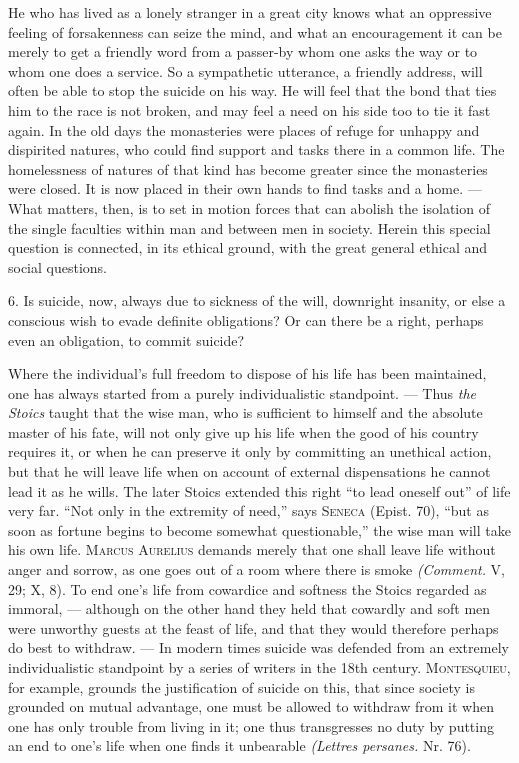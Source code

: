 \documentclass[12pt,a4paper,openany]{book}
\newcommand{\opage}[1]{\marginnote{\footnotesize\textit{[#1]}}}
\begin{document}
He who has lived as a lonely stranger in a great city knows what an oppressive feeling of forsakenness can seize
the mind, and what an encouragement it can be merely to get a friendly word from a passer-by whom one asks the way
or to whom one does a service. So a sympathetic utterance, a friendly address, will often be able to stop the
suicide on his way. He will feel that the bond that ties him to the race is not broken, and may feel a need on his
side too to tie it fast again. In the old days the monasteries were places of refuge for unhappy and dispirited
natures, who could find support and tasks there in a common life. The homelessness of natures of that kind has
become greater since the monasteries were closed. It is now placed in their own hands to find tasks and a home.
--- What
\opage{214}matters, then, is to set in motion forces that can abolish the isolation of the single faculties within
man and between men in society. Herein this special question is connected, in its ethical ground, with the great
general ethical and social questions.

6. Is suicide, now, always due to sickness of the will, downright insanity, or else a conscious wish to evade
definite obligations? Or can there be a right, perhaps even an obligation, to commit suicide?

Where the individual's full freedom to dispose of his life has been maintained, one has always started from a
purely individualistic standpoint. --- Thus \textit{the Stoics} taught that the wise man, who is sufficient to
himself and the absolute master of his fate, will not only give up his life when the good of his country requires
it, or when he can preserve it only by committing an unethical action, but that he will leave life when on account
of external dispensations he cannot lead it as he wills. The later Stoics extended this right ``to lead oneself
out'' of life very far. ``Not only in the extremity of need,'' says \textsc{Seneca} (Epist. 70), ``but as soon as
fortune begins to become somewhat questionable,'' the wise man will take his own life. \textsc{Marcus Aurelius}
demands merely that one shall leave life without anger and sorrow, as one goes out of a room where there is
smoke \textit{(Comment.} V, 29; X, 8). To end one's life from cowardice and softness the Stoics regarded as
immoral, --- although on the other hand they held that cowardly and soft men were unworthy guests at the feast of
life, and that they would therefore perhaps do best to withdraw. --- In modern times suicide was defended from an
extremely individualistic standpoint by a series of writers in the 18th century. \textsc{Montesquieu}, for
example, grounds the justification of suicide on this, that since society is grounded on mutual advantage, one
must be allowed to withdraw from it when one has only trouble from living in it; one thus transgresses no duty by
putting an end to one's life when one finds it unbearable \textit{(Lettres persanes.} Nr. 76).
\end{document}
